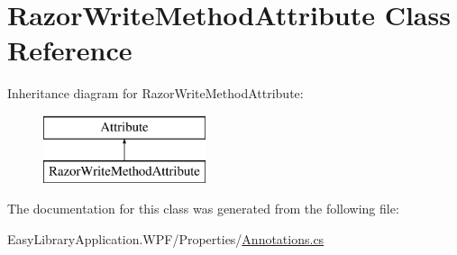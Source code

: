 \hypertarget{class_razor_write_method_attribute}{}\section{Razor\+Write\+Method\+Attribute Class Reference}
\label{class_razor_write_method_attribute}
Inheritance diagram for Razor\+Write\+Method\+Attribute\+:\begin{figure}[H]
\begin{center}
\leavevmode
\includegraphics[height=2.000000cm]{class_razor_write_method_attribute}
\end{center}
\end{figure}


The documentation for this class was generated from the following file\+:\begin{DoxyCompactItemize}
\item 
Easy\+Library\+Application.\+W\+P\+F/\+Properties/\mbox{\hyperlink{_annotations_8cs}{Annotations.\+cs}}\end{DoxyCompactItemize}
